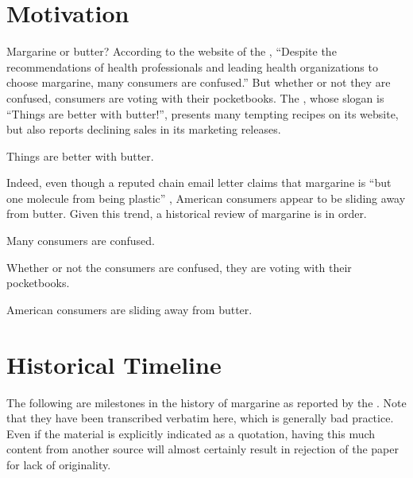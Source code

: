 \documentclass[opre,nonblindrev]{informs3} %
\begin{document}
\section{Motivation}

Margarine or butter? According to the website of the
\cite{namm}, ``Despite the
recommendations of health professionals and leading health
organizations to choose margarine, many consumers are confused.''
But whether or not they are confused, consumers are voting with
their pocketbooks.  The
\cite{abi}, whose
slogan is ``Things are better with butter!'', presents many tempting
recipes on its website, but also reports declining sales in its
marketing releases.

\begin{hypothesis}
Things are better with butter.
\end{hypothesis}

Indeed, even though a reputed chain email letter claims that margarine is ``but
one molecule from being plastic''
\citep{btc},
American consumers appear to be
sliding away from butter. Given this trend, a historical review of
margarine is in order.


\begin{lemma}
Many consumers are confused.
\end{lemma}

\begin{lemma}
Whether or not the consumers are confused, they are voting with
their pocketbooks.
\end{lemma}

\begin{proposition}
American consumers are sliding away from butter.
\end{proposition}


\section{Historical Timeline}

The following are milestones in the history of margarine as
reported by the
\cite{namm2}.
Note that they have been transcribed verbatim here, which
is generally bad practice.  Even if the material is explicitly
indicated as a quotation, having this much content from another
source will almost certainly result in rejection of the paper for
lack of originality.
\end{document}
